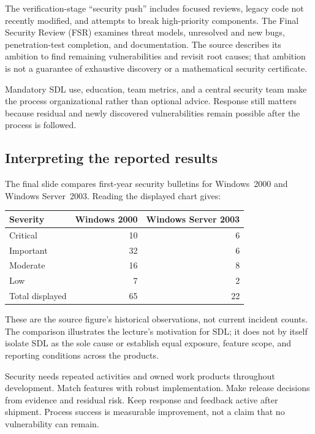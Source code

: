 \documentclass[11pt,a4paper]{article}
\numberwithin{figure}{section}
\begin{document}
The verification-stage ``security push'' includes focused reviews, legacy code not recently modified, and attempts to break high-priority components. The Final Security Review (FSR) examines threat models, unresolved and new bugs, penetration-test completion, and documentation. The source describes its ambition to find remaining vulnerabilities and revisit root causes; that ambition is not a guarantee of exhaustive discovery or a mathematical security certificate.

Mandatory SDL use, education, team metrics, and a central security team make the process organizational rather than optional advice. Response still matters because residual and newly discovered vulnerabilities remain possible after the process is followed.

\subsection{Interpreting the reported results}
The final slide compares first-year security bulletins for Windows~2000 and Windows Server~2003. Reading the displayed chart gives:
\begin{center}\begin{tabular}{@{}lrr@{}}\toprule
Severity & Windows 2000 & Windows Server 2003\\\midrule
Critical & 10 & 6\\
Important & 32 & 6\\
Moderate & 16 & 8\\
Low & 7 & 2\\\midrule
Total displayed & 65 & 22\\\bottomrule
\end{tabular}\end{center}
These are the source figure's historical observations, not current incident counts. The comparison illustrates the lecture's motivation for SDL; it does not by itself isolate SDL as the sole cause or establish equal exposure, feature scope, and reporting conditions across the products.

\begin{takeaway}
Security needs repeated activities and owned work products throughout development. Match features with robust implementation. Make release decisions from evidence and residual risk. Keep response and feedback active after shipment. Process success is measurable improvement, not a claim that no vulnerability can remain.
\end{takeaway}
\end{document}
